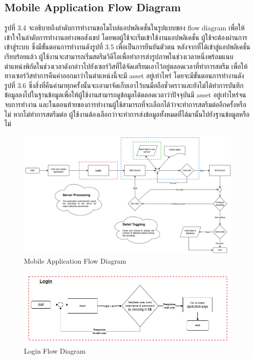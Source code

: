 \newpage
\subsection{Mobile Application Flow Diagram}
รูปที่ 3.4 จะอธิบายถึงลำดับการทำงานขอโมไบล์แอปพลิเคชั่นในรูปแบบของ flow diagram เพื่อให้เข้าใจในลำดับการทำงานอย่างพอสังเขป โดยพอผู้ใช้จะเริ่มเข้าใช้งานแอปพลิเคชั่น 
ผู้ใช้จะต้องผ่านการเข้าสู่ระบบ ซึ่งมีขั้นตอนการทำงานดังรูปที่ 3.5 เพื่อเป็นการยืนยันตัวตน หลังจากที่ได้เข้าสู่แอปพลิเคชั่นเรียบร้อยแล้ว 
ผู้ใช้งานจะสามารถเริ่มสตรีมวิดีโอเพื่อทำการส่งรูปภาพในช่วงเวลาหนึ่งพร้อมแนบตำแหน่งพิกัดในช่วงเวลาดังกล่าวไปยังเซอร์วิสที่ได้จัดเตรียมเอาไว้อยู่ตลอดเวลาที่ทำการสตรีม 
เพื่อให้ทางเซอร์วิสทำการคืนค่าออกมาว่าในตำแหน่งนี้จะมี asset อยู่เท่าไหร่ โดยจะมีขั้นตอนการทำงานดังรูปที่ 3.6 
ซึ่งสิ่งที่คืนค่ามาทุกครั้งนั้นจะเอามาจัดเก็บเอาไว้บนมือถือชั่วคราวและยังไม่ได้ทำการบันทึกข้อมูลลงไปในฐานข้อมูลเพื่อให้ผู้ใช้งานสามารถดูข้อมูลได้ตลอดเวลาว่าปัจจุบันมี 
asset อยู่เท่าไหร่จนจบการทำงาน และในตอนท้ายของการทำงานผู้ใช้สามารถที่จะเลือกได้ว่าจะทำการสตรีมต่ออีกครั้งหรือไม่ หากไม่ทำการสตรีมต่อ 
ผู้ใช้งานต้องเลือกว่าจะทำการส่งข้อมูลทั้งหมดที่ได้มานั้นไปยังฐานข้อมูลหรือไม่
\begin{figure}[ht]
  \begin{center}
  \includegraphics[scale=0.5]{resources/MobileAppFlow.png}
  \end{center}
  \caption[Mobile Application Flow Diagram]{Mobile Application Flow Diagram}
  \label{fig:mopile-app flow design}
\end{figure}

\begin{figure}[ht]
  \begin{center}
  \includegraphics[scale=0.6]{resources/LoginFlow.png}
  \end{center}
  \caption[Login Flow Diagram]{Login Flow Diagram}
  \label{fig:login flow design}
\end{figure}


